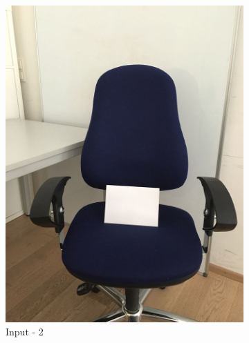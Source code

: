 \documentclass[paper=a4, fontsize=10pt]{scrartcl} %
\numberwithin{equation}{section} %
\numberwithin{figure}{section} %
\begin{document}
\begin{figure}
	\centering
	\begin{subfigure}[b]{0.35\textwidth}
		\includegraphics[width=\textwidth]{02}
		\caption{Input - 2}
		\label{fig:input_02}
	\end{subfigure}
	~ 
	\begin{subfigure}[b]{0.35\textwidth}

\end{subfigure}
\end{figure}
\end{document}
